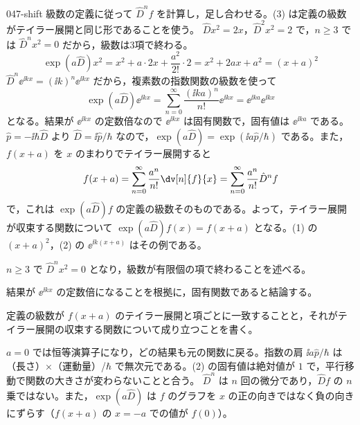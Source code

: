 \documentclass[uplatex,dvipdfmx,a4paper,11pt]{jsarticle}
\begin{document}
\kaitouhen
{}
\begin{kaisetsu}{047-shift}
\houshin 級数の定義に従って $\hat{D}^{n}f$ を計算し，足し合わせる。(3) は定義の級数がテイラー展開と同じ形であることを使う。
\keisan {} $\hat{D}x^{2}=2x$，$\hat{D}^{2}x^{2}=2$ で，$n\ge 3$ では $\hat{D}^{n}x^{2}=0$ だから，級数は3項で終わる。
\[ \exp(a\hat{D})x^{2}=x^{2}+a\cdot 2x+\frac{a^{2}}{2!}\cdot 2=x^{2}+2ax+a^{2}=(x+a)^{2} \]
 $\hat{D}^{n}\ee^{\ii kx}=(\ii k)^{n}\ee^{\ii kx}$ だから，複素数の指数関数の級数を使って
\[ \exp(a\hat{D})\ee^{\ii kx}=\sum_{n=0}^{\infty}\frac{(\ii ka)^{n}}{n!}\ee^{\ii kx}=\ee^{\ii ka}\ee^{\ii kx} \]
となる。結果が $\ee^{\ii kx}$ の定数倍なので $\ee^{\ii kx}$ は固有関数で，固有値は $\ee^{\ii ka}$ である。
 $\hat{p}=-\ii\hbar\hat{D}$ より $\hat{D}=\ii\hat{p}/\hbar$ なので，$\exp(a\hat{D})=\exp(\ii a\hat{p}/\hbar)$ である。また，$f(x+a)$ を $x$ のまわりでテイラー展開すると
\[ f(x+a)=\sum_{n=0}^{\infty}\frac{a^{n}}{n!}\dv[n]{f}{x}=\sum_{n=0}^{\infty}\frac{a^{n}}{n!}\hat{D}^{n}f \]
で，これは $\exp(a\hat{D})f$ の定義の級数そのものである。よって，テイラー展開が収束する関数について $\exp(a\hat{D})f(x)=f(x+a)$ となる。(1) の $(x+a)^{2}$，(2) の $\ee^{\ii k(x+a)}$ はその例である。
\begin{ronten}
  \item {} $n\ge 3$ で $\hat{D}^{n}x^{2}=0$ となり，級数が有限個の項で終わることを述べる。
  \item {} 結果が $\ee^{\ii kx}$ の定数倍になることを根拠に，固有関数であると結論する。
  \item {} 定義の級数が $f(x+a)$ のテイラー展開と項ごとに一致することと，それがテイラー展開の収束する関数について成り立つことを書く。
\end{ronten}
\kenzan $a=0$ では恒等演算子になり，どの結果も元の関数に戻る。指数の肩 $\ii a\hat{p}/\hbar$ は（長さ）×（運動量）/$\hbar$ で無次元である。(2) の固有値は絶対値が $1$ で，平行移動で関数の大きさが変わらないことと合う。
\tsumazuki $\hat{D}^{n}$ は $n$ 回の微分であり，$\hat{D}f$ の $n$ 乗ではない。また，$\exp(a\hat{D})$ は $f$ のグラフを $x$ の正の向きではなく負の向きにずらす（$f(x+a)$ の $x=-a$ での値が $f(0)$）。
\end{kaisetsu}
\end{document}
